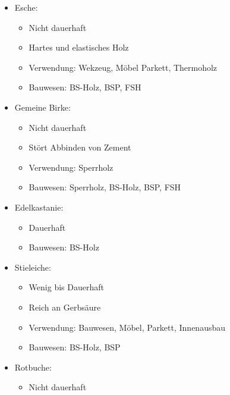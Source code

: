 \documentclass[fleqn,twoside]{article}
\begin{document}
\begin{itemize}
\begin{itemize}
\begin{itemize}
                        \end{itemize}
                    \item Esche:
                        \begin{itemize}
                            \item Nicht dauerhaft
                            \item Hartes und elastisches Holz
                            \item Verwendung: Wekzeug, Möbel Parkett, Thermoholz
                            \item Bauwesen: BS-Holz, BSP, FSH
                        \end{itemize}
                    \item Gemeine Birke:
                        \begin{itemize}
                            \item Nicht dauerhaft
                            \item Stört Abbinden von Zement
                            \item Verwendung: Sperrholz
                            \item Bauwesen: Sperrholz, BS-Holz, BSP, FSH
                        \end{itemize}
                    \item Edelkastanie:
                        \begin{itemize}
                            \item Dauerhaft
                            \item Bauwesen: BS-Holz
                        \end{itemize}
                    \item Stieleiche:
                        \begin{itemize}
                            \item Wenig bis Dauerhaft
                            \item Reich an Gerbsäure
                            \item Verwendung: Bauwesen, Möbel, Parkett, Innenausbau
                            \item Bauwesen: BS-Holz, BSP
                        \end{itemize}
                    \item Rotbuche:
                        \begin{itemize}
                            \item Nicht dauerhaft

\end{itemize}
\end{itemize}
\end{itemize}
\end{document}
